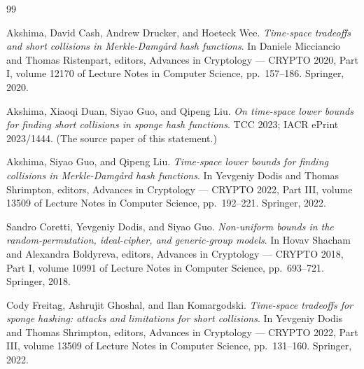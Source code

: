 \documentclass{aicr-conjecture}
\begin{document}
\begin{aicrbibliography}{99}

Akshima, David Cash, Andrew Drucker, and Hoeteck Wee.
\emph{Time-space tradeoffs and short collisions in Merkle-Damg\aa{}rd
hash functions}.
In Daniele Micciancio and Thomas Ristenpart, editors, Advances in
Cryptology --- CRYPTO 2020, Part I, volume 12170 of Lecture Notes in
Computer Science, pp.\ 157--186. Springer, 2020.

Akshima, Xiaoqi Duan, Siyao Guo, and Qipeng Liu.
\emph{On time-space lower bounds for finding short collisions in sponge
hash functions}.
TCC 2023; IACR ePrint 2023/1444. (The source paper of this statement.)

Akshima, Siyao Guo, and Qipeng Liu.
\emph{Time-space lower bounds for finding collisions in
Merkle-Damg\aa{}rd hash functions}.
In Yevgeniy Dodis and Thomas Shrimpton, editors, Advances in Cryptology
--- CRYPTO 2022, Part III, volume 13509 of Lecture Notes in Computer
Science, pp.\ 192--221. Springer, 2022.

Sandro Coretti, Yevgeniy Dodis, and Siyao Guo.
\emph{Non-uniform bounds in the random-permutation, ideal-cipher, and
generic-group models}.
In Hovav Shacham and Alexandra Boldyreva, editors, Advances in
Cryptology --- CRYPTO 2018, Part I, volume 10991 of Lecture Notes in
Computer Science, pp.\ 693--721. Springer, 2018.

Cody Freitag, Ashrujit Ghoshal, and Ilan Komargodski.
\emph{Time-space tradeoffs for sponge hashing: attacks and limitations
for short collisions}.
In Yevgeniy Dodis and Thomas Shrimpton, editors, Advances in Cryptology
--- CRYPTO 2022, Part III, volume 13509 of Lecture Notes in Computer
Science, pp.\ 131--160. Springer, 2022.

\end{aicrbibliography}
\end{document}
